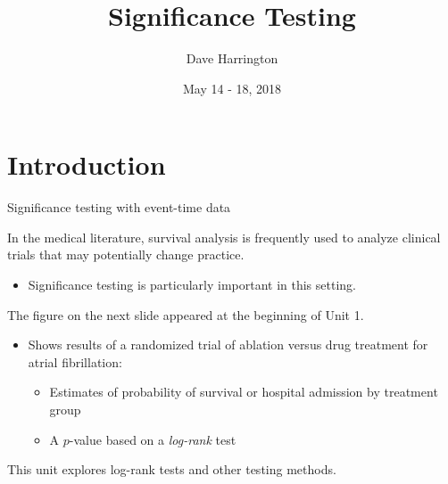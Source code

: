 \documentclass[ignorenonframetext,]{beamer}
\title{Significance Testing}
\author{Dave Harrington}
\date{May 14 - 18, 2018}
\providecommand{\tightlist}{%
  \setlength{\itemsep}{0pt}\setlength{\parskip}{0pt}}
\begin{document}
\frame{\titlepage}

\begin{frame}
\tableofcontents[hideallsubsections]
\end{frame}
\hypertarget{introduction}{%
\section{Introduction}\label{introduction}}

\begin{frame}{%
\protect\hypertarget{significance-testing-with-event-time-data}{%
Significance testing with event-time data}}

In the medical literature, survival analysis is frequently used to
analyze clinical trials that may potentially change practice.

\begin{itemize}
\tightlist
\item
  Significance testing is particularly important in this setting.
\end{itemize}

The figure on the next slide appeared at the beginning of Unit 1.

\begin{itemize}
\item
  Shows results of a randomized trial of ablation versus drug treatment
  for atrial fibrillation:

  \begin{itemize}
  \item
    Estimates of probability of survival or hospital admission by
    treatment group
  \item
    A \(p\)-value based on a \emph{log-rank} test
  \end{itemize}
\end{itemize}

This unit explores log-rank tests and other testing methods.

\end{frame}
\end{document}
